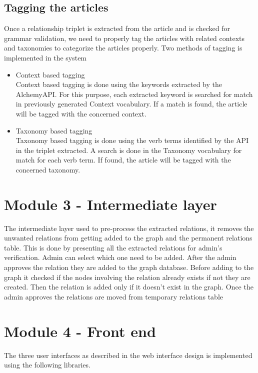 \subsection{Tagging the articles}
\par Once a relationship triplet is extracted from the article and is checked for grammar validation, we need to properly tag the articles with related contexts and taxonomies to categorize the articles properly. Two methods of tagging is implemented in the system

\begin{itemize}
\item Context based tagging
\\ Context based tagging is done using the keywords extracted by the AlchemyAPI. For this purpose, each extracted keyword is searched for match in previously generated Context vocabulary. If a match is found, the article will be tagged with the concerned context.
\item Taxonomy based tagging
\\ Taxonomy based tagging is done using the verb terms identified by the API in the triplet extracted. A search is done in the Taxonomy vocabulary for match for each verb term. If found, the article will be tagged with the concerned taxonomy.
\end{itemize}

\section{Module 3 - Intermediate layer}
\par 
The intermediate layer used to pre-process the extracted relations, it removes the unwanted relations from getting added to the graph and the permanent relations table. This is done by presenting all the extracted relations for admin’s verification. Admin can select which one need to be added. After the admin approves the relation they are added to the graph database. Before adding to the graph it checked if the nodes involving the relation already exists if not they are created. Then the relation is added only if it doesn’t exist in the graph. Once the admin approves the relations are moved from temporary relations table

\section{Module 4 - Front end}
\par The three user interfaces as described in the web interface design is implemented using the following libraries.
